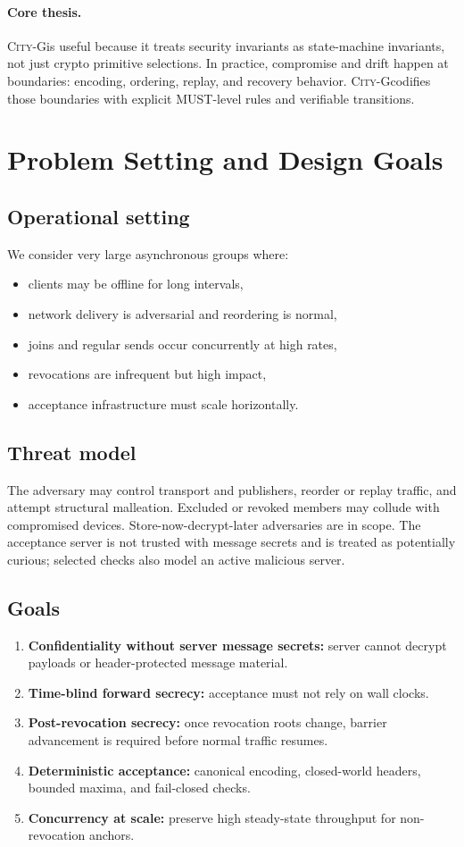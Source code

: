 \documentclass[11pt]{article}
\newcommand{\cityg}{\textsc{City-G}}
\begin{document}
\paragraph{Core thesis.}
\cityg is useful because it treats security invariants as state-machine invariants, not just crypto primitive selections. In practice, compromise and drift happen at boundaries: encoding, ordering, replay, and recovery behavior. \cityg codifies those boundaries with explicit MUST-level rules and verifiable transitions.

\section{Problem Setting and Design Goals}
\subsection{Operational setting}
We consider very large asynchronous groups where:
\begin{itemize}
  \item clients may be offline for long intervals,
  \item network delivery is adversarial and reordering is normal,
  \item joins and regular sends occur concurrently at high rates,
  \item revocations are infrequent but high impact,
  \item acceptance infrastructure must scale horizontally.
\end{itemize}

\subsection{Threat model}
The adversary may control transport and publishers, reorder or replay traffic, and attempt structural malleation. Excluded or revoked members may collude with compromised devices. Store-now-decrypt-later adversaries are in scope. The acceptance server is not trusted with message secrets and is treated as potentially curious; selected checks also model an active malicious server.

\subsection{Goals}
\begin{enumerate}
  \item \textbf{Confidentiality without server message secrets:} server cannot decrypt payloads or header-protected message material.
  \item \textbf{Time-blind forward secrecy:} acceptance must not rely on wall clocks.
  \item \textbf{Post-revocation secrecy:} once revocation roots change, barrier advancement is required before normal traffic resumes.
  \item \textbf{Deterministic acceptance:} canonical encoding, closed-world headers, bounded maxima, and fail-closed checks.
  \item \textbf{Concurrency at scale:} preserve high steady-state throughput for non-revocation anchors.
\end{enumerate}
\end{document}
